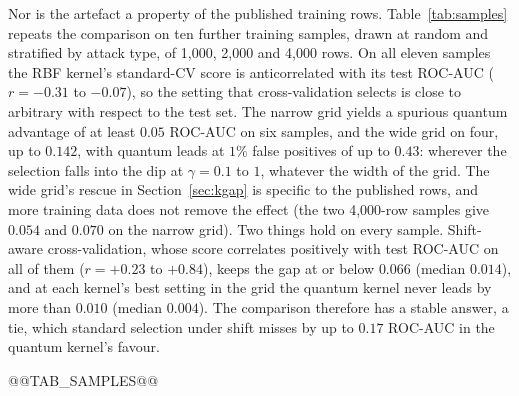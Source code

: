 Nor is the artefact a property of the published training rows. Table~\ref{tab:samples} repeats the
comparison on ten further training samples, drawn at random and stratified by attack type, of 1{,}000,
2{,}000 and 4{,}000 rows. On all eleven samples the RBF kernel's standard-CV score is anticorrelated with
its test ROC-AUC ($r=-0.31$ to $-0.07$), so the setting that cross-validation selects is close to
arbitrary with respect to the test set. The narrow grid yields a spurious quantum advantage of at least
$0.05$ ROC-AUC on six samples, and the wide grid on four, up to $0.142$, with quantum leads at $1\%$ false
positives of up to $0.43$: wherever the selection falls into the dip at $\gamma=0.1$ to $1$, whatever the
width of the grid. The wide grid's rescue in Section~\ref{sec:kgap} is specific to the published rows, and
more training data does not remove the effect (the two 4{,}000-row samples give $0.054$ and $0.070$ on the
narrow grid). Two things hold on every sample. Shift-aware cross-validation, whose score correlates
positively with test ROC-AUC on all of them ($r=+0.23$ to $+0.84$), keeps the gap at or below $0.066$
(median $0.014$), and at each kernel's best setting in the grid the quantum kernel never leads by more than
$0.010$ (median $0.004$). The comparison therefore has a stable answer, a tie, which standard selection
under shift misses by up to $0.17$ ROC-AUC in the quantum kernel's favour.

@@TAB_SAMPLES@@
